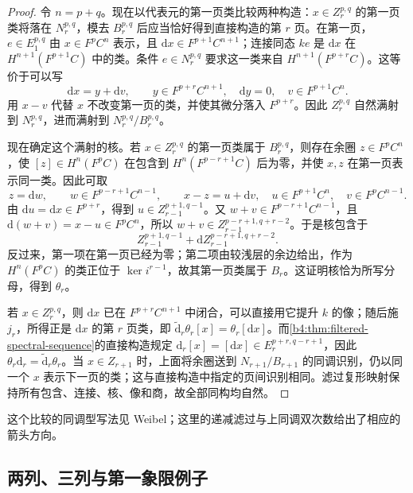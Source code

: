 \begin{proof}
	令 \(n=p+q\)。现在以代表元的第一页类比较两种构造：\(x\in Z_r^{p,q}\) 的第一页类将落在 \(N_r^{p,q}\)，模去 \(B_r^{p,q}\) 后应当恰好得到直接构造的第 \(r\) 页。在第一页，\(e\in E_1^{p,q}\) 由 \(x\in F^pC^n\) 表示，且 \(\mathrm{d}x\in F^{p+1}C^{n+1}\)；连接同态 \(ke\) 是 \(\mathrm{d}x\) 在 \(H^{n+1}(F^{p+1}C)\) 中的类。条件 \(e\in N_r^{p,q}\) 要求这一类来自 \(H^{n+1}(F^{p+r}C)\)。这等价于可以写
	\[
		\mathrm{d}x=y+\mathrm{d}v, \qquad y\in F^{p+r}C^{n+1},\quad \mathrm{d}y=0,\quad v\in F^{p+1}C^n.
	\]
	用 \(x-v\) 代替 \(x\) 不改变第一页的类，并使其微分落入 \(F^{p+r}\)。因此 \(Z_r^{p,q}\) 自然满射到 \(N_r^{p,q}\)，进而满射到 \(N_r^{p,q}/B_r^{p,q}\)。

	现在确定这个满射的核。若 \(x\in Z_r^{p,q}\) 的第一页类属于 \(B_r^{p,q}\)，则存在余圈 \(z\in F^pC^n\)，使 \([z]\in H^n(F^pC)\) 在包含到 \(H^n(F^{p-r+1}C)\) 后为零，并使 \(x,z\) 在第一页表示同一类。因此可取
	\[
		z=\mathrm{d}w,\qquad w\in F^{p-r+1}C^{n-1}, \qquad x-z=u+\mathrm{d}v, \quad u\in F^{p+1}C^n,\quad v\in F^pC^{n-1}.
	\]
	由 \(\mathrm{d}u=\mathrm{d}x\in F^{p+r}\)，得到 \(u\in Z_{r-1}^{p+1,q-1}\)。又 \(w+v\in F^{p-r+1}C^{n-1}\)，且 \(\mathrm{d}(w+v)=x-u\in F^pC^n\)，所以 \(w+v\in Z_{r-1}^{p-r+1,q+r-2}\)。于是核包含于
	\[
		Z_{r-1}^{p+1,q-1} +\mathrm{d}Z_{r-1}^{p-r+1,q+r-2}.
	\]
	反过来，第一项在第一页已经为零；第二项由较浅层的余边给出，作为 \(H^n(F^pC)\) 的类正位于 \(\ker i^{r-1}\)，故其第一页类属于 \(B_r\)。这证明核恰为所写分母，得到 \(\theta_r\)。

	若 \(x\in Z_r^{p,q}\)，则 \(\mathrm{d}x\) 已在 \(F^{p+r}C^{n+1}\) 中闭合，可以直接用它提升 \(k\) 的像；随后施 \(j_r\)，所得正是 \(\mathrm{d}x\) 的第 \(r\) 页类，即 \(\widetilde{\mathrm d}_r\theta_r[x]=\theta_r[\mathrm dx]\)。而\cref{b4:thm:filtered-spectral-sequence}的直接构造规定 \(\mathrm d_r[x]=[\mathrm dx]\in E_r^{p+r,q-r+1}\)，因此 \(\theta_r\mathrm{d}_r=\widetilde{\mathrm{d}}_r\theta_r\)。当 \(x\in Z_{r+1}\) 时，上面将余圈送到 \(N_{r+1}/B_{r+1}\) 的同调识别，仍以同一个 \(x\) 表示下一页的类；这与直接构造中指定的页间识别相同。滤过复形映射保持所有包含、连接、核、像和商，故全部同构均自然。
\end{proof}

这个比较的同调型写法见 Weibel\cite[Theorem 5.9.4, pp. 155--156]{Weibel1994HomologicalAlgebra}；这里的递减滤过与上同调双次数给出了相应的箭头方向。

\subsection{两列、三列与第一象限例子}
\label{b4:subsec:1404:02}

